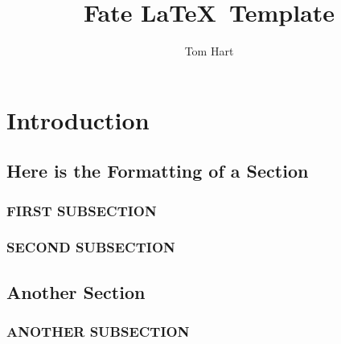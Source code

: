 \documentclass{book}
\title{Fate \LaTeX \ Template}
\author{Tom Hart}
\begin{document}
\chapter{Introduction}

\lipsum[2-4]

\pagebreak
\begin{callout}[title=A CALLOUT SPANS THE PAGE]
\lipsum[3]
\end{callout}

\section{Here is the Formatting of a Section}

\lipsum[2]

\subsection{FIRST SUBSECTION}

\lipsum[1]

\subsection{SECOND SUBSECTION}

\lipsum[1]

\section{Another Section}

\lipsum[1]

\subsection{ANOTHER SUBSECTION}

\lipsum[1]
\end{document}
